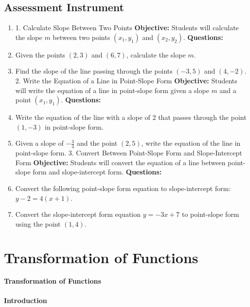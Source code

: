 \subsection{Assessment Instrument}

\begin{enumerate}
    \item 1. Calculate Slope Between Two Points \textbf{Objective:} Students will calculate the slope $m$ between two points $(x_1, y_1)$ and $(x_2, y_2)$. \textbf{Questions:}
    \item Given the points $(2, 3)$ and $(6, 7)$, calculate the slope $m$.
    \item Find the slope of the line passing through the points $(-3, 5)$ and $(4, -2)$. 2. Write the Equation of a Line in Point-Slope Form \textbf{Objective:} Students will write the equation of a line in point-slope form given a slope $m$ and a point $(x_1, y_1)$. \textbf{Questions:}
    \item Write the equation of the line with a slope of $2$ that passes through the point $(1, -3)$ in point-slope form.
    \item Given a slope of $-\frac{3}{4}$ and the point $(2, 5)$, write the equation of the line in point-slope form. 3. Convert Between Point-Slope Form and Slope-Intercept Form \textbf{Objective:} Students will convert the equation of a line between point-slope form and slope-intercept form. \textbf{Questions:}
    \item Convert the following point-slope form equation to slope-intercept form: $y - 2 = 4(x + 1)$.
    \item Convert the slope-intercept form equation $y = -3x + 7$ to point-slope form using the point $(1, 4)$.
\end{enumerate}

\section{Transformation of Functions}
\label{sec:transformation-of-functions}

\paragraph{Transformation of Functions}

\paragraph{Introduction}

